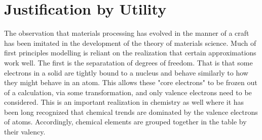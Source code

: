\section{Justification by Utility}
The observation that materials processing has evolved in the manner 
of a craft has been imitated in the development of the 
theory of materials science. Much of first principles modelling is reliant on
the realization that certain approximations work well. The first is 
the separatation of degrees of freedom. That is that some electrons in a solid are
tightly bound to a nucleus and behave similarly to how they might behave in an atom.
This allows these "core electrons" to be frozen out of a calculation, 
via some transformation, and only valence electrons need to be considered. 
This is an important realization in chemistry as well where it has 
been long recognized that chemical trends are dominated by
the valence electrons of atoms. Accordingly, chemical elements are 
grouped together in the table by their valency. 


